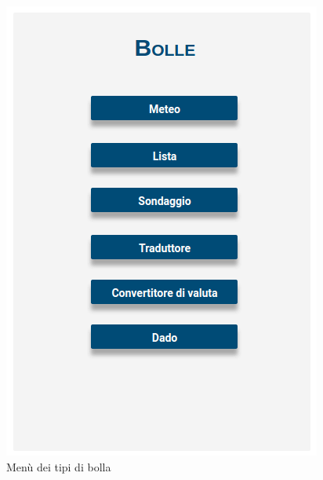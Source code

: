 \begin{frame}
	\begin{figure}
		\begin{center}
			\caption{Menù dei tipi di bolla}
			\includegraphics[scale=0.35]{img/mockup_2.png}
		\end{center}
	\end{figure}	
\end{frame}

